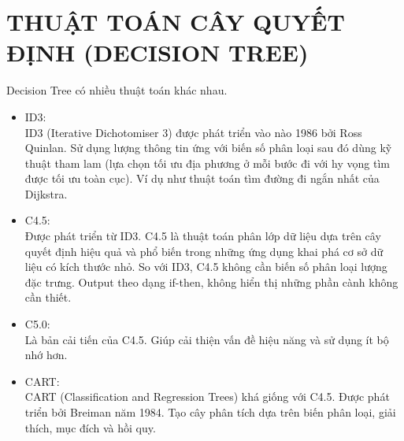 \chapter{THUẬT TOÁN CÂY QUYẾT ĐỊNH (DECISION TREE)}

Decision Tree có nhiều thuật toán khác nhau.

\begin{itemize}
    \item ID3:\\
    ID3 (Iterative Dichotomiser 3) được phát triển vào nào 1986 bởi Ross Quinlan.
    Sử dụng lượng thông tin ứng với biến số phân loại sau đó dùng kỹ thuật tham lam
    (lựa chọn tối ưu địa phương ở mỗi bước đi với hy vọng tìm được tối ưu toàn cục).
    Ví dụ như thuật toán tìm đường đi ngắn nhất của Dijkstra.
    \item C4.5:\\
    Được phát triển từ ID3. C4.5 là thuật toán phân lớp dữ liệu dựa trên cây quyết định
    hiệu quả và phổ biến trong những ứng dụng khai phá cơ sở dữ liệu có kích thước nhỏ.
    So với ID3, C4.5 không cần biến số phân loại lượng đặc trưng.
    Output theo dạng if-then, không hiển thị những phần cành không cần thiết.
    \item C5.0:\\
    Là bản cải tiến của C4.5. Giúp cải thiện vấn đề hiệu năng và sử dụng ít bộ nhớ hơn.
    \item CART:\\
    CART (Classification and Regression Trees) khá giống với C4.5.
    Được phát triển bởi Breiman năm 1984. Tạo cây phân tích dựa trên biến phân loại,
    giải thích, mục đích và hồi quy.
\end{itemize}
